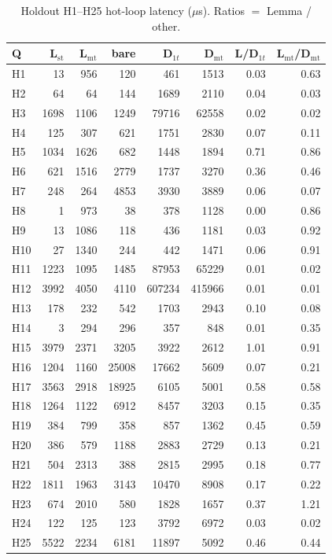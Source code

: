 \documentclass[sigconf, nonacm]{acmart}
\begin{document}
\begin{table}[t]
  \centering
  \small
  \caption{Holdout H1--H25 hot-loop latency ($\mu$s). Ratios $=$ Lemma / other.}
  \label{tab:holdout-h1-h25}
  \begin{tabular}{lrrrrrrr}
    \toprule
    Q & L$_{\mathrm{st}}$ & L$_{\mathrm{mt}}$ & bare & D$_{1t}$ & D$_{\mathrm{mt}}$ & L/D$_{1t}$ & L$_{\mathrm{mt}}$/D$_{\mathrm{mt}}$ \\
    \midrule
H1 & 13 & 956 & 120 & 461 & 1513 & 0.03 & 0.63 \\
H2 & 64 & 64 & 144 & 1689 & 2110 & 0.04 & 0.03 \\
H3 & 1698 & 1106 & 1249 & 79716 & 62558 & 0.02 & 0.02 \\
H4 & 125 & 307 & 621 & 1751 & 2830 & 0.07 & 0.11 \\
H5 & 1034 & 1626 & 682 & 1448 & 1894 & 0.71 & 0.86 \\
H6 & 621 & 1516 & 2779 & 1737 & 3270 & 0.36 & 0.46 \\
H7 & 248 & 264 & 4853 & 3930 & 3889 & 0.06 & 0.07 \\
H8 & 1 & 973 & 38 & 378 & 1128 & 0.00 & 0.86 \\
H9 & 13 & 1086 & 118 & 436 & 1181 & 0.03 & 0.92 \\
H10 & 27 & 1340 & 244 & 442 & 1471 & 0.06 & 0.91 \\
H11 & 1223 & 1095 & 1485 & 87953 & 65229 & 0.01 & 0.02 \\
H12 & 3992 & 4050 & 4110 & 607234 & 415966 & 0.01 & 0.01 \\
H13 & 178 & 232 & 542 & 1703 & 2943 & 0.10 & 0.08 \\
H14 & 3 & 294 & 296 & 357 & 848 & 0.01 & 0.35 \\
H15 & 3979 & 2371 & 3205 & 3922 & 2612 & 1.01 & 0.91 \\
H16 & 1204 & 1160 & 25008 & 17662 & 5609 & 0.07 & 0.21 \\
H17 & 3563 & 2918 & 18925 & 6105 & 5001 & 0.58 & 0.58 \\
H18 & 1264 & 1122 & 6912 & 8457 & 3203 & 0.15 & 0.35 \\
H19 & 384 & 799 & 358 & 857 & 1362 & 0.45 & 0.59 \\
H20 & 386 & 579 & 1188 & 2883 & 2729 & 0.13 & 0.21 \\
H21 & 504 & 2313 & 388 & 2815 & 2995 & 0.18 & 0.77 \\
H22 & 1811 & 1963 & 3143 & 10470 & 8908 & 0.17 & 0.22 \\
H23 & 674 & 2010 & 580 & 1828 & 1657 & 0.37 & 1.21 \\
H24 & 122 & 125 & 123 & 3792 & 6972 & 0.03 & 0.02 \\
H25 & 5522 & 2234 & 6181 & 11897 & 5092 & 0.46 & 0.44 \\
    \bottomrule
  \end{tabular}
\end{table}
\end{document}
